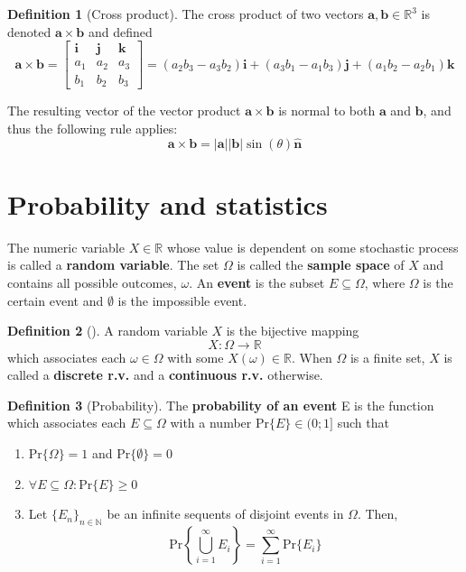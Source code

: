 \documentclass[a4paper, 12pt]{report}
\theoremstyle{definition}
\newtheorem{definition}{Definition}[chapter]
\begin{document}
\renewcommand{\arraystretch}{1}
\begin{definition}[Cross product]
    The cross product of two vectors $\mathbf a, \mathbf b \in \mathbb R^3$ 
    is denoted $\mathbf a \times \mathbf b$ and defined
    \[
        \mathbf a \times \mathbf b = \begin{bmatrix}
            \mathbf i & \mathbf j & \mathbf k \\
            a_1       & a_2       & a_3       \\
            b_1       & b_2       & b_3
        \end{bmatrix} =
        (a_2b_3 - a_3b_2)\mathbf i + (a_3b_1 - a_1b_3)\mathbf j + (a_1b_2 - a_2b_1)\mathbf k
    \]
\end{definition}
The resulting vector of the vector product $\mathbf a \times \mathbf b$ is normal to both $\mathbf a$ and $\mathbf b$,
and thus the following rule applies:
\[
    \mathbf a \times \mathbf b = |\mathbf a||\mathbf b| \sin(\theta) \hat{\mathbf n}
\]
\section{Probability and statistics}
The numeric variable $X \in \mathbb R$ whose value is dependent on some stochastic process is called a \textbf{random variable}. The set $\Omega$ is called the \textbf{sample space} of $X$ and contains all possible outcomes, $\omega$. An \textbf{event} is the subset $E \subseteq \Omega$, where $\Omega$ is the certain event and $\emptyset$ is the impossible event.

\begin{definition}[]
    A random variable $X$ is the bijective mapping
    \[
        X: \Omega \to \mathbb R
    \]
    which associates each $\omega \in \Omega$ with some $X(\omega) \in \mathbb R$. When $\Omega$ is a finite set, $X$ is called a \textbf{discrete r.v.} and a \textbf{continuous r.v.} otherwise.
\end{definition}

\begin{definition}[Probability]
    The \textbf{probability of an event} E is the function which associates each $E \subseteq \Omega$ with a number $\text{Pr}\{E\} \in (0;1]$ such that
    \begin{enumerate}
        \item Pr$\{\Omega\} = 1$ and Pr$\{\emptyset\} = 0$
        \item $\forall E \subseteq \Omega: \text{Pr}\{E\} \geq 0$
        \item Let $\{E_n\}_{n \in \mathbb N}$ be an infinite sequents of disjoint events in $\Omega$. Then,
        \[
            \text{Pr}\left\{\bigcup_{i = 1}^\infty E_i\right\} = \sum_{i = 1}^\infty \text{Pr}\{E_i\}
        \]
    \end{enumerate}
\end{definition}
\end{document}
